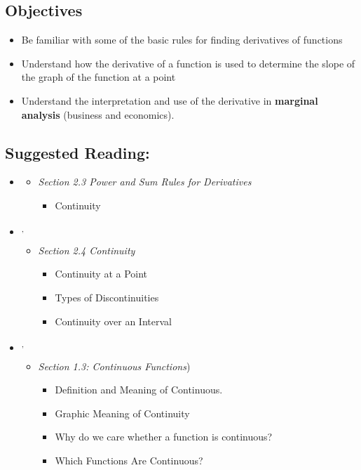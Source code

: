 \vspace{-0.25 in}
\begin{framed}
\subsection*{Objectives}
\begin{itemize}
    \item Be familiar with some of the basic rules for finding derivatives of functions
    \item Understand how the derivative of a function is used to determine the slope of the graph of the function at a point
    \item Understand the interpretation and use of the derivative in \textbf{marginal analysis} (business and economics).
\end{itemize}

\subsection*{Suggested Reading:}
\begin{itemize}
\item \cite{Calaway}\footnotemark[1]
   \begin{itemize}
        \item \emph{Section 2.3 Power and Sum Rules for Derivatives}
        \begin{itemize}
            \item Continuity 
        \end{itemize}
    \end{itemize}

\item \cite{openstax}\footnotemark[2]\textsuperscript{,}\footnotemark[3]
    \begin{itemize}
        \item \emph{Section 2.4 Continuity}
        \begin{itemize}
            \item Continuity at a Point
            \item Types of Discontinuities
            \item Continuity over an Interval
        \end{itemize}
    \end{itemize}
\item \cite{Hoffman}\footnotemark[3]\textsuperscript{,}\footnotemark[4]
    \begin{itemize}
        \item \emph{Section 1.3: Continuous Functions})
        \begin{itemize}
            \item Definition and Meaning of Continuous.
           \item Graphic Meaning of Continuity
            \item Why do we care whether a function is continuous?
            \item Which Functions Are Continuous?
        \end{itemize}
        

\end{itemize}
\end{itemize}
\end{framed}
